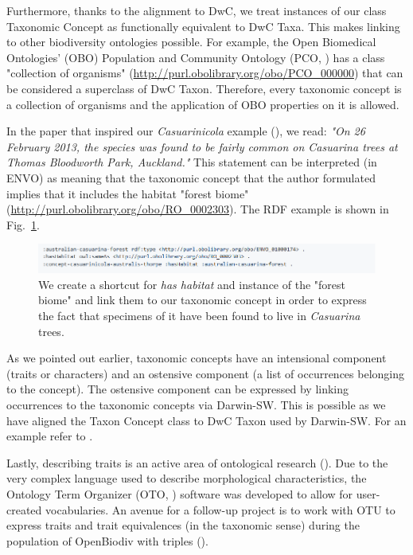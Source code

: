 Furthermore, thanks to the alignment to DwC, we treat instances of our class Taxonomic Concept as functionally equivalent to DwC Taxa. This makes linking to other biodiversity ontologies possible. For example, the Open Biomedical Ontologies' (OBO) Population and Community Ontology (PCO, \cite{walls_semantics_2014}) has a class "collection of organisms" (\url{http://purl.obolibrary.org/obo/PCO_000000}) that can be considered a superclass of DwC Taxon. Therefore, every taxonomic concept is a collection of organisms and the application of OBO properties on it is allowed.

In the paper that inspired our \emph{Casuarinicola} example (\cite{thorpe_casuarinicola_2013}), we read: \emph{"On 26 February 2013, the species was found to be fairly common on Casuarina trees at Thomas Bloodworth Park, Auckland."} This statement can be interpreted (in ENVO) as meaning that the taxonomic concept that the author formulated implies that it includes the habitat "forest biome" (\url{http://purl.obolibrary.org/obo/RO_0002303}). The RDF example is shown in Fig.~\ref{example-envo}.

\begin{figure}[h!]
\centering
  \includegraphics[width=\textwidth]{Figures/example-envo}
  \decoRule
  \caption[Example of combining ENVO with OpenBiodiv-O.]{We create a shortcut for \emph{has habitat} and instance of the "forest biome" and link them to our taxonomic concept in order to express the fact that specimens of it have been found to live in \emph{Casuarina} trees.}
  \label{example-envo}
\end{figure}

As we pointed out earlier, taxonomic concepts have an intensional component (traits or characters) and an ostensive component (a list of occurrences belonging to the concept). The ostensive component can be expressed by linking occurrences to the taxonomic concepts via Darwin-SW. This is possible as we have aligned the Taxon Concept class to DwC Taxon used by Darwin-SW. For an example refer to \cite{baskauf_darwin-sw:_2016}.

Lastly, describing traits is an active area of ontological research (\cite{huang_oto:_2015}). Due to the very complex language used to describe morphological characteristics, the Ontology Term Organizer (OTO, \cite{huang_oto:_2015}) software was developed to allow for user-created vocabularies. An avenue for a follow-up project is to work with OTU to express traits and trait equivalences (in the taxonomic sense) during the population of OpenBiodiv with triples (\cite{hong_explorer_2018}).

